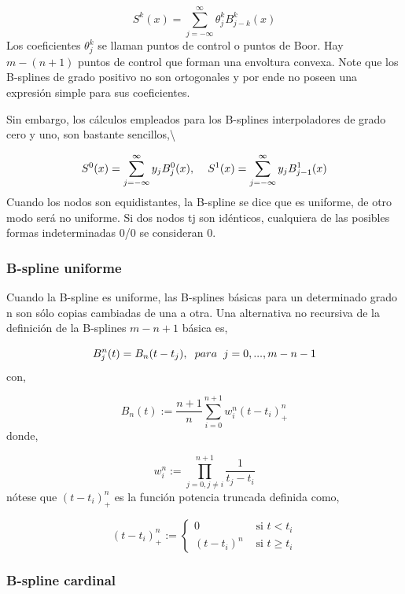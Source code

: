 \documentclass[
  12pt,
]{krantz}
\begin{document}
\[\displaystyle{S^{k}(x) = \sum_{j=-\infty}^{\infty} \theta^{k}_{j} B^{k}_{j-k}(x)}\]
Los coeficientes \(\theta^{k}_{j}\) se llaman puntos de control o puntos de Boor. Hay \(m-(n+1)\) puntos de control que forman una envoltura convexa. Note que los B-splines de grado positivo no son ortogonales y por ende no poseen una expresión simple para sus coeficientes.

Sin embargo, los cálculos empleados para los B-splines interpoladores de grado cero y uno, son bastante sencillos,\textbackslash{}

\[\displaystyle{S^{0}(x) = \sum_{j=-\infty}^{\infty} y_{j} B^{0}_{j}(x),\hspace{0.4cm} S^{1}(x) = \sum_{j=-\infty}^{\infty} y_{j} B^{1}_{j-1}(x) }\]
Cuando los nodos son equidistantes, la B-spline se dice que es uniforme, de otro modo será no uniforme. Si dos nodos tj son idénticos, cualquiera de las posibles formas indeterminadas 0/0 se consideran 0.

\hypertarget{b-spline-uniforme}{%
\subsubsection{B-spline uniforme}\label{b-spline-uniforme}}

Cuando la B-spline es uniforme, las B-splines básicas para un determinado grado n son sólo copias cambiadas de una a otra. Una alternativa no recursiva de la definición de la B-splines \(m-n+1\) básica es,

\[\displaystyle{B_{j}^{n}(t)= B_{n}(t-t_{j}), \hspace{0.2cm}para \hspace{0.2cm}j=0,...,m-n-1 }\]
con,

\[\displaystyle{B_{n}(t):= \frac{n+1}{n} \sum_{i=0}^{n+1}w_{i}^{n}(t - t_{i})_{+}^{n}   }\]
donde,

\[\displaystyle{w_{i}^{n} := \prod_{j=0, j\neq i}^{n+1} \frac{1}{t_{j}- t_{i}}}\]
nótese que \((t - t_{i})_{+}^{n}\) es la función potencia truncada definida como,

\[
(t - t_{i})_{+}^{n} :=  \left\{
\begin{array}{ll}
0 &  \text{ si }  t < t_{i} \\
(t - t_{i})^{n}   & \text{ si }  t \ge t_{i}
\end{array}
\right.
\]

\hypertarget{b-spline-cardinal}{%
\subsubsection{B-spline cardinal}\label{b-spline-cardinal}}
\end{document}
